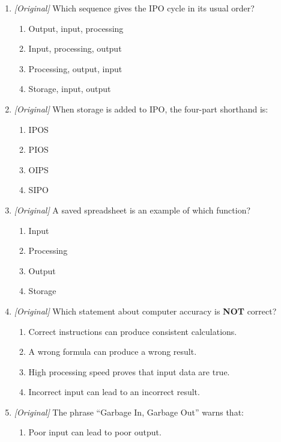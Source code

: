 \documentclass[11pt]{article}
\begin{document}
\begin{enumerate}[label=\textbf{Q\arabic*.}, leftmargin=*]
\begin{enumerate}[label=\Alph*.]
    \item Programming
    \item Peripheral
  \end{enumerate}
\item \textit{[Original]} Which sequence gives the IPO cycle in its usual
  order?
  \begin{enumerate}[label=\Alph*.]
    \item Output, input, processing
    \item Input, processing, output
    \item Processing, output, input
    \item Storage, input, output
  \end{enumerate}
\item \textit{[Original]} When storage is added to IPO, the four-part
  shorthand is:
  \begin{enumerate}[label=\Alph*.]
    \item IPOS
    \item PIOS
    \item OIPS
    \item SIPO
  \end{enumerate}
\item \textit{[Original]} A saved spreadsheet is an example of which
  function?
  \begin{enumerate}[label=\Alph*.]
    \item Input
    \item Processing
    \item Output
    \item Storage
  \end{enumerate}
\item \textit{[Original]} Which statement about computer accuracy is
  \textbf{NOT} correct?
  \begin{enumerate}[label=\Alph*.]
    \item Correct instructions can produce consistent calculations.
    \item A wrong formula can produce a wrong result.
    \item High processing speed proves that input data are true.
    \item Incorrect input can lead to an incorrect result.
  \end{enumerate}
\item \textit{[Original]} The phrase ``Garbage In, Garbage Out'' warns that:
  \begin{enumerate}[label=\Alph*.]
    \item Poor input can lead to poor output.

\end{enumerate}
\end{enumerate}
\end{document}
